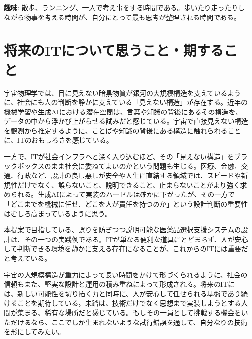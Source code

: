 \documentclass[11pt,a4paper,ja=minimal,xelatex]{bxjsarticle}
\begin{document}
\textbf{趣味}: 散歩、ランニング、一人で考え事をする時間である。歩いたり走ったりしながら物事を考える時間が、自分にとって最も思考が整理される時間である。

\section*{ 将来のITについて思うこと・期すること}
宇宙物理学では、目に見えない暗黒物質が銀河の大規模構造を支えているように、社会にも人の判断を静かに支えている「見えない構造」が存在する。近年の機械学習や生成AIにおける潜在空間は、言葉や知識の背後にあるその構造を、データの中から浮かび上がらせる試みだと感じている。宇宙で直接見えない構造を観測から推定するように、ことばや知識の背後にある構造に触れられることに、ITのおもしろさを感じている。

一方で、ITが社会インフラへと深く入り込むほど、その「見えない構造」をブラックボックスのまま社会に委ねてよいのかという問題も生じる。医療、金融、交通、行政など、設計の良し悪しが安全や人生に直結する領域では、スピードや新規性だけでなく、誤らないこと、説明できること、止まらないことがより強く求められる。生成AIによって実装のハードルは確かに下がったが、その一方で「どこまでを機械に任せ、どこを人が責任を持つのか」という設計判断の重要性はむしろ高まっているように思う。

本提案で目指している、誤りを防ぎつつ説明可能な医薬品選択支援システムの設計は、その一つの実践例である。ITが単なる便利な道具にとどまらず、人が安心して判断できる環境を静かに支える存在になることが、これからのITには重要だと考えている。

宇宙の大規模構造が重力によって長い時間をかけて形づくられるように、社会の信頼もまた、堅実な設計と運用の積み重ねによって形成される。将来のITには、新しい可能性を切り拓く力と同時に、人が安心して任せられる基盤であり続けることを期待している。未踏は、技術だけでなく思想まで実装しようとする人間が集まる、稀有な場所だと感じている。もしその一員として挑戦する機会をいただけるなら、ここでしか生まれないような試行錯誤を通して、自分なりの技術を形にしてみたい。
\end{document}
